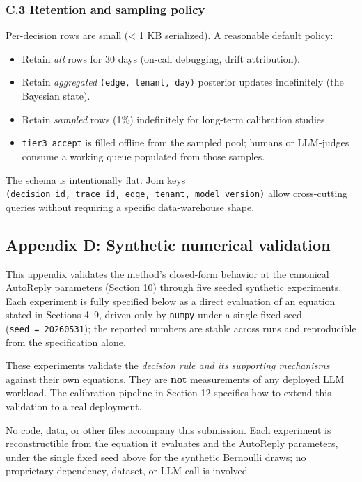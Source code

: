 \documentclass[
  11pt,
]{article}
\providecommand{\tightlist}{%
  \setlength{\itemsep}{0pt}\setlength{\parskip}{0pt}}
\begin{document}
\subsubsection{C.3 Retention and sampling
policy}\label{c.3-retention-and-sampling-policy}

Per-decision rows are small (\textless{} 1 KB serialized). A reasonable
default policy:

\begin{itemize}
\tightlist
\item
  Retain \emph{all} rows for 30 days (on-call debugging, drift
  attribution).
\item
  Retain \emph{aggregated} \texttt{(edge,\ tenant,\ day)} posterior
  updates indefinitely (the Bayesian state).
\item
  Retain \emph{sampled} rows (1\%) indefinitely for long-term
  calibration studies.
\item
  \texttt{tier3\_accept} is filled offline from the sampled pool; humans
  or LLM-judges consume a working queue populated from those samples.
\end{itemize}

The schema is intentionally flat. Join keys
\texttt{(decision\_id,\ trace\_id,\ edge,\ tenant,\ model\_version)}
allow cross-cutting queries without requiring a specific data-warehouse
shape.

\subsection{Appendix D: Synthetic numerical
validation}\label{appendix-d-synthetic-numerical-validation}

This appendix validates the method's closed-form behavior at the
canonical AutoReply parameters (Section 10) through five seeded
synthetic experiments. Each experiment is fully specified below as a
direct evaluation of an equation stated in Sections 4--9, driven only by
\texttt{numpy} under a single fixed seed (\texttt{seed\ =\ 20260531});
the reported numbers are stable across runs and reproducible from the
specification alone.

These experiments validate the \emph{decision rule and its supporting
mechanisms} against their own equations. They are \textbf{not}
measurements of any deployed LLM workload. The calibration pipeline in
Section 12 specifies how to extend this validation to a real deployment.

No code, data, or other files accompany this submission. Each experiment
is reconstructible from the equation it evaluates and the AutoReply
parameters, under the single fixed seed above for the synthetic
Bernoulli draws; no proprietary dependency, dataset, or LLM call is
involved.
\end{document}
